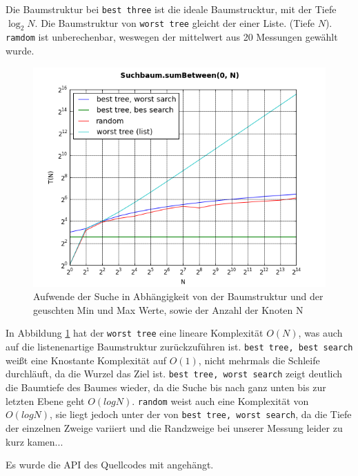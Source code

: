 \documentclass[
   draft=false
  ,paper=a4
  ,twoside=false
  ,fontsize=11pt
  ,headsepline
  ,DIV11
  ,parskip=full+
]{scrartcl} %
\begin{document}
Die Baumstruktur bei \texttt{best three} ist die ideale Baumstrucktur, mit der Tiefe $\log_2 N$. Die Baumstruktur von \texttt{worst tree} gleicht der einer Liste. (Tiefe $N$). \texttt{ramdom} ist unberechenbar, weswegen der mittelwert aus 20 Messungen gewählt wurde.  
 
	
\begin{figure}[htp]
	\label{fig:plot}
  	\centering
    \includegraphics[width=\textwidth]{./IMG/plot.png}
    \caption[recur iter fast]{Aufwende der Suche in Abhängigkeit von der Baumstruktur und der geuschten Min und Max Werte, sowie der Anzahl der Knoten N}
\end{figure}
	
In Abbildung \ref{fig:plot} hat der \texttt{worst tree} eine lineare Komplexität $O(N)$, was auch auf die listenenartige Baumstruktur zurückzuführen ist. \texttt{best tree, best search} weißt eine Knostante Komplexität auf $O(1)$, nicht mehrmals die Schleife durchläuft, da die Wurzel das Ziel ist.
 \texttt{best tree, worst search} zeigt deutlich die Baumtiefe des Baumes wieder, da die Suche bis nach ganz unten bis zur letzten Ebene geht $O(log N)$.
 \texttt{random} weist auch eine Komplexität von $O(log N)$, sie liegt jedoch
unter der von \texttt{best tree, worst search}, da die Tiefe der einzelnen Zweige variiert und die Randzweige bei unserer Messung leider zu kurz kamen...

Es wurde die API des Quellcodes mit angehängt.
\end{document}
